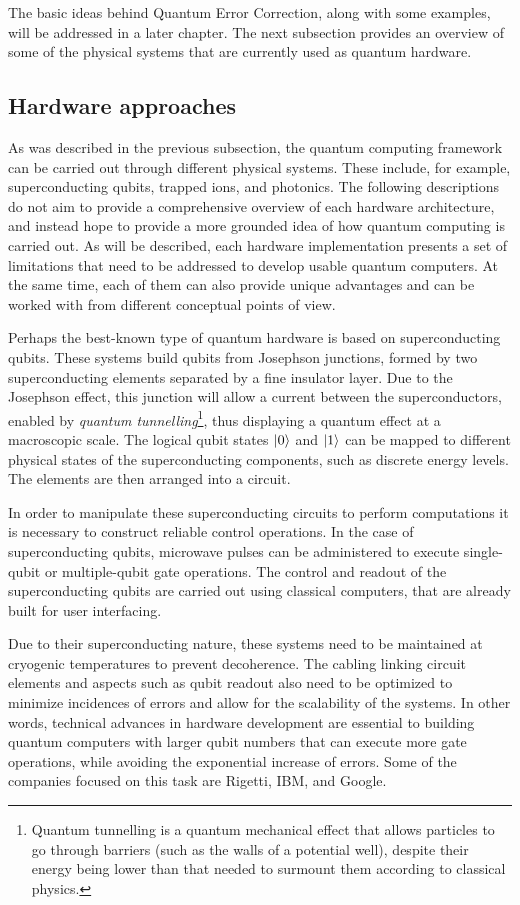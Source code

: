 The basic ideas behind Quantum Error Correction, along with some examples, will be addressed in a later chapter. The next subsection provides an overview of some of the physical systems that are currently used as quantum hardware.

\subsection{Hardware approaches}

As was described in the previous subsection, the quantum computing framework can be carried out through different physical systems. These include, for example, superconducting qubits, trapped ions, and photonics. The following descriptions do not aim to provide a comprehensive overview of each hardware architecture, and instead hope to provide a more grounded idea of how quantum computing is carried out. As will be described, each hardware implementation presents a set of limitations that need to be addressed to develop usable quantum computers. At the same time, each of them can also provide unique advantages and can be worked with from different conceptual points of view. 

Perhaps the best-known type of quantum hardware is based on superconducting qubits. These systems build qubits from Josephson junctions, formed by two superconducting elements separated by a fine insulator layer. Due to the Josephson effect, this junction will allow a current between the superconductors, enabled by \textit{quantum tunnelling}\footnote{Quantum tunnelling is a quantum mechanical effect that allows particles to go through barriers (such as the walls of a potential well), despite their energy being lower than that needed to surmount them according to classical physics.}, thus displaying a quantum effect at a macroscopic scale. The logical qubit states $\ket{0}$ and $\ket{1}$ can be mapped to different physical states of the superconducting components, such as discrete energy levels. The elements are then arranged into a circuit. 

In order to manipulate these superconducting circuits to perform computations it is necessary to construct reliable control operations. In the case of superconducting qubits, microwave pulses can be administered to execute single-qubit or multiple-qubit gate operations. The control and readout of the superconducting qubits are carried out using classical computers, that are already built for user interfacing.

Due to their superconducting nature, these systems need to be maintained at cryogenic temperatures to prevent decoherence. The cabling linking circuit elements and aspects such as qubit readout also need to be optimized to minimize incidences of errors and allow for the scalability of the systems. In other words, technical advances in hardware development are essential to building quantum computers with larger qubit numbers that can execute more gate operations, while avoiding the exponential increase of errors. Some of the companies focused on this task are Rigetti, IBM, and Google.

